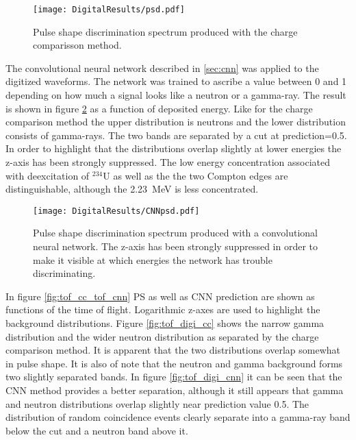 \documentclass[main.tex]{subfiles}
\begin{document}
\begin{figure}[ht]
    \centering
        \texttt{[image: DigitalResults/psd.pdf]}
        \caption[PSD spectrum, digital setup.]{Pulse shape discrimination spectrum produced with the charge comparisson method.}
        \label{fig:psd_d}
\end{figure}

The convolutional neural network described in \ref{sec:cnn} was applied to the digitized waveforms. The network was trained to ascribe a value between 0 and 1 depending on how much a signal looks like a neutron or a gamma-ray. The result is shown in figure \ref{fig:cnn_E} as a function of deposited energy. Like for the charge comparison method the upper distribution is neutrons and the lower distribution consists of gamma-rays. The two bands are separated by a cut at prediction=0.5. In order to highlight that the distributions overlap slightly at lower energies the z-axis has been strongly suppressed. The low energy concentration associated with deexcitation of $^\text{234}$U as well as the the two Compton edges are distinguishable, although the \SI{2.23}{\MeV} is less concentrated.

\begin{figure}[ht]
    \centering
        \texttt{[image: DigitalResults/CNNpsd.pdf]}
        \caption[PSD spectrum obtained with CNN]{Pulse shape discrimination spectrum produced with a convolutional neural network. The z-axis has been strongly suppressed in order to make it visible at which energies the network has trouble discriminating.}
    \label{fig:cnn_E} 
\end{figure}

In figure \ref{fig:tof_cc_tof_cnn} PS as well as CNN prediction are shown as functions of the time of flight. Logarithmic z-axes are used to highlight the background distributions. Figure \ref{fig:tof_digi_cc} shows the narrow gamma distribution and the wider neutron distribution as separated by the charge comparison method. It is apparent that the two distributions overlap somewhat in pulse shape. It is also of note that the neutron and gamma background forms two slightly separated bands.  In figure \ref{fig:tof_digi_cnn} it can be seen that the CNN method provides a better separation, although it still appears that gamma and neutron distributions overlap slightly near prediction value 0.5. The distribution of random coincidence events clearly separate into a gamma-ray band below the cut and a neutron band above it.
\end{document}
